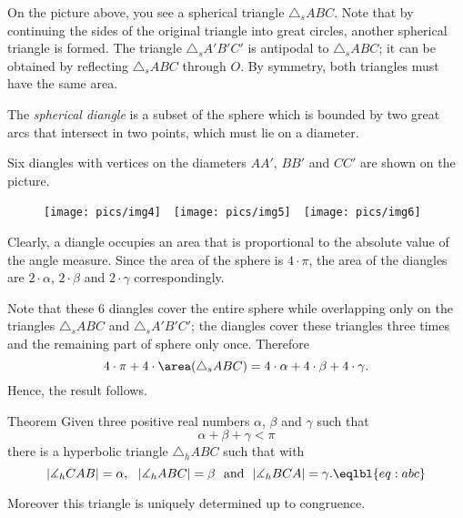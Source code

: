 {On the picture above, you see a spherical triangle $\triangle_sABC$.
Note that by continuing the sides of the original triangle into
great circles, another spherical triangle is formed. The triangle $\triangle_sA'B'C'$
is antipodal to $\triangle_sABC$; it can be obtained by reflecting $\triangle_sABC$ through $O$. 
By symmetry, both triangles must
have the same area.

The \emph{spherical diangle} is a subset of the sphere which is bounded by two great arcs that intersect in two points, which must lie on a diameter. 

Six diangles
with vertices on the diameters $AA'$, $BB'$ and $CC'$ are shown on the picture.

\begin{figure}[h]
\texttt{[image: pics/img4]}\ \ 
\texttt{[image: pics/img5]}\ \ 
\texttt{[image: pics/img6]}
\end{figure}

Clearly, a diangle occupies an area that is proportional to the absolute value of the angle measure. 
Since the area of the sphere
is $4\cdot\pi$, 
the area of the diangles are $2\cdot\alpha$, $2\cdot\beta$ and $2\cdot\gamma$ correspondingly.

Note that these 6 diangles cover the entire sphere while overlapping
only on the triangles $\triangle_s ABC$ and $\triangle_s A'B'C'$;
the diangles cover these triangles three times and the remaining part of sphere only once.
Therefore 
$$
4\cdot\pi + 4\cdot\area(\triangle_s ABC)= 4\cdot \alpha+4\cdot \beta+4\cdot\gamma.
$$
Hence, the result follows.
\qeds













\begin{thm}{Theorem}\label{thm:sum-trig-h}
Given three positive real numbers $\alpha$, $\beta$ and $\gamma$ such that
$$\alpha+\beta+\gamma<\pi$$ 
there is a hyperbolic triangle $\triangle_hABC$
such that with
$$|\measuredangle_hCAB|=\alpha,\ \ |\measuredangle_hABC|=\beta\ \ \text{and}\ \ |\measuredangle_hBCA|=\gamma.\eqlbl{eq:abc}$$
 
Moreover this triangle is uniquely determined up to congruence. 
\end{thm}


}
